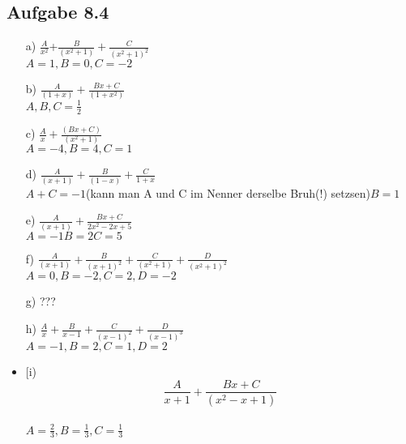 \documentclass{standalone}
\begin{document}
\subsection{Aufgabe 8.4}
\begin{itemize}
	\item[a)]
	$\frac{A}{x^2}$+$\frac{B}{(x^2+1)}+\frac{C}{(x^2+1)^2}$\\
	$A=1, B=0, C=-2$
	\item[b)]
	$\frac{A}{(1+x)}+\frac{Bx+C}{(1+x^2)}$\\
	$A,B,C=\frac{1}{2}$
	\item[c)]
	$\frac{A}{x}+\frac{(Bx+C)}{(x^2+1)}$\\
	$A=-4, B=4, C=1$
	\item[d)]
	$\frac{A}{(x+1)}+\frac{B}{(1-x)}+\frac{C}{1+x}$\\
	$A+C=-1$(kann man A und C im Nenner derselbe Bruh(!) setzsen)$B=1$
	\item[e)]
	$\frac{A}{(x+1)}+\frac{Bx+C}{2x^2-2x+5}$\\
	$A=-1 B=2 C=5$
	\item[f)]
	$\frac{A}{(x+1)}+\frac{B}{(x+1)^2}+\frac{C}{(x^2+1)}+\frac{D}{(x^2+1)^2}$\\
	$A=0, B=-2, C=2, D=-2$
	\item[g)]
	???
	\item[h)]
	$\frac{A}{x}+\frac{B}{x-1}+\frac{C}{(x-1)^2}+\frac{D}{(x-1)^3}$\\
	$A=-1, B=2, C=1, D=2$
	\item[i)
	$$\frac{A}{x+1}+\frac{Bx+C}{(x^2-x+1)}$$\\
	$A=\frac{2}{3}, B=\frac{1}{3}, C=\frac{1}{3}$
	
\end{itemize}
\end{document}
